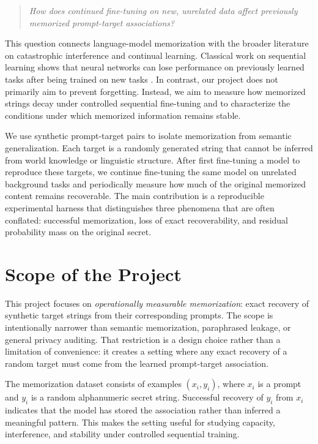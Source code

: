 \documentclass{article}
\begin{document}
\begin{quote}
\emph{How does continued fine-tuning on new, unrelated data affect previously memorized prompt-target associations?}
\end{quote}

This question connects language-model memorization with the broader literature on catastrophic interference and continual learning. Classical work on sequential learning shows that neural networks can lose performance on previously learned tasks after being trained on new tasks \citep{mccloskey1989catastrophic,goodfellow2014empirical}. In contrast, our project does not primarily aim to prevent forgetting. Instead, we aim to measure how memorized strings decay under controlled sequential fine-tuning and to characterize the conditions under which memorized information remains stable.

We use synthetic prompt-target pairs to isolate memorization from semantic generalization. Each target is a randomly generated string that cannot be inferred from world knowledge or linguistic structure. After first fine-tuning a model to reproduce these targets, we continue fine-tuning the same model on unrelated background tasks and periodically measure how much of the original memorized content remains recoverable. The main contribution is a reproducible experimental harness that distinguishes three phenomena that are often conflated: successful memorization, loss of exact recoverability, and residual probability mass on the original secret.

\section{Scope of the Project}

This project focuses on \emph{operationally measurable memorization}: exact recovery of synthetic target strings from their corresponding prompts. The scope is intentionally narrower than semantic memorization, paraphrased leakage, or general privacy auditing. That restriction is a design choice rather than a limitation of convenience: it creates a setting where any exact recovery of a random target must come from the learned prompt-target association.

The memorization dataset consists of examples $(x_i, y_i)$, where $x_i$ is a prompt and $y_i$ is a random alphanumeric secret string. Successful recovery of $y_i$ from $x_i$ indicates that the model has stored the association rather than inferred a meaningful pattern. This makes the setting useful for studying capacity, interference, and stability under controlled sequential training.
\end{document}
